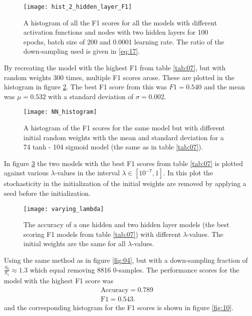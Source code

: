 \documentclass[uio,jmp,amsmath,amssymb,reprint,nofootinbib]{revtex4-1}
\numberwithin{equation}{section}
\begin{document}
\begin{figure}[H]
    \centering
    \texttt{[image: hist\_2\_hidden\_layer\_F1]}
    \caption{A histogram of all the F1 scores for all the models with different activation functions and nodes with two hidden layers for 100 epochs, batch size of 200 and 0.0001 learning rate. The ratio of the down-sampling used is given in \ref{eq:17}.}
    \label{fig:07}
\end{figure}

By recreating the model with the highest F1 from table \ref{tab:07}, but with random weights 300 times, multiple F1 scores arose. These are plotted in the histogram in figure \ref{fig:08}. The best F1 score from this was \(F1 = 0.540\) and the mean was \(\mu = 0.532\) with a standard deviation of \(\sigma = 0.002\).

\begin{figure}[H]
    \centering
    \texttt{[image: NN\_histogram]}
    \caption{A histogram of the F1 scores for the same model but with different initial random weights with the mean and standard deviation for a 74 tanh - 104 sigmoid model (the same as in table \ref{tab:07}).}
    \label{fig:08}
\end{figure}

In figure \ref{fig:09} the two models with the best F1 scores from table \ref{tab:07} is plotted against various \(\lambda\)-values in the interval \(\lambda \in [10^{-7}, 1]\). In this plot the stochasticity in the initialization of the initial weights are removed by applying a seed before the initialization.

\begin{figure}[H]
    \centering
    \texttt{[image: varying\_lambda]}
    \caption{The accuracy of a one hidden and two hidden layer models (the best scoring F1 models from table \ref{tab:07}) with different \(\lambda\)-values. The initial weights are the same for all \(\lambda\)-values.}
    \label{fig:09}
\end{figure}

Using the same method as in figure \ref{fig:04}, but with a down-sampling fraction of \(\frac{S_0}{S_1}\approx 1.3\) which equal removing 8816 0-samples. The performance scores for the model with the highest F1 score was
\begin{align}
\text{Accuracy} = 0.789\\
\text{F1} = 0.543.
\end{align}
and the corresponding histogram for the F1 scores is shown in figure \ref{fig:10}.
\end{document}
